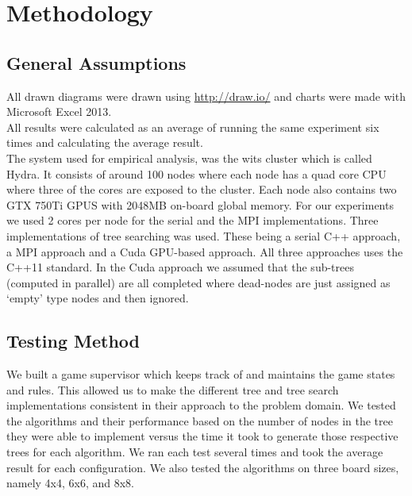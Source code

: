 \documentclass[a4paper]{article}
\begin{document}
\section{Methodology}
\subsection{General Assumptions}
All drawn diagrams were drawn using \url{http://draw.io/} and charts were made with Microsoft Excel 2013.\\ All results were calculated as an average of running the same experiment six times and calculating the average result.\\
\noindent The system used for empirical analysis, was the wits cluster which is called Hydra. It consists of around 100 nodes where each node has a quad core CPU where three of the cores are exposed to the cluster. Each node also contains two GTX 750Ti GPUS with 2048MB on-board global memory. For our experiments we used 2 cores per node for the serial and the MPI implementations.
Three implementations of tree searching was used. These being a serial C++ approach, a MPI approach and a Cuda GPU-based approach. All three approaches uses the C++11 standard.
In the Cuda approach we assumed that the sub-trees (computed in parallel) are all completed where dead-nodes are just assigned as ‘empty’ type nodes and then ignored.


\subsection{Testing Method}
We built a game supervisor which keeps track of and maintains the game states and rules. This allowed us to make the different tree and tree search implementations consistent in their approach to the problem domain. 
We tested the algorithms and their performance based on the number of nodes in the tree they were able to implement versus the time it took to generate those respective trees for each algorithm. We ran each test several times and took the average result for each configuration.
We also tested the algorithms on three board sizes, namely 4x4, 6x6, and 8x8.
\end{document}
